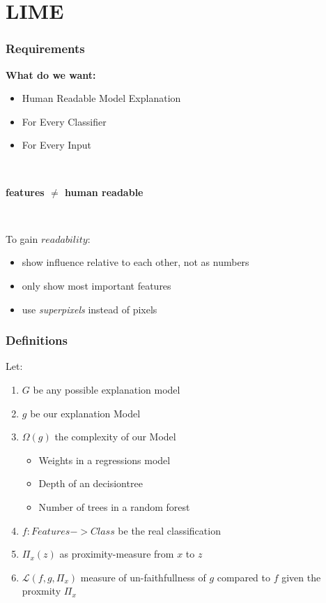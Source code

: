 \section{LIME}
\begin{frame}
	\frametitle{Requirements}
	\begin{Large}
		\textbf{What do we want:}
		\begin{itemize}
			\item Human Readable Model Explanation
			\item For Every Classifier
			\item For Every Input
		\end{itemize}
	~\newline
	\begin{center}
		\textbf{ features $\neq$ human readable }
	\end{center}
	~\newline
	\end{Large}
	To gain $readability$: 
	\begin{itemize}
		\item show influence relative to each other, not as numbers
		\item only show most important features
		\item use \textit{superpixels} instead of pixels
	\end{itemize}
\end{frame}

\begin{frame}
	\frametitle{Definitions}
	Let:
	\begin{enumerate}
		\item $G$ be any possible explanation model
		\item $g$ be our explanation Model
		\item $\Omega(g)$ the complexity of our Model
		\begin{itemize}
			\item Weights in a regressions model
			\item Depth of an decisiontree
			\item Number of trees in a random forest
		\end{itemize}
		\item $f: Features -> Class $ be the real classification
		\item $\Pi_x(z)$ as proximity-measure from $x$ to $z$
		\item $\mathcal{L}(f,g,\Pi_x)$ measure of un-faithfullness of $g$ compared to $f$ given the proxmity $\Pi_x$
	\end{enumerate}
\end{frame}

